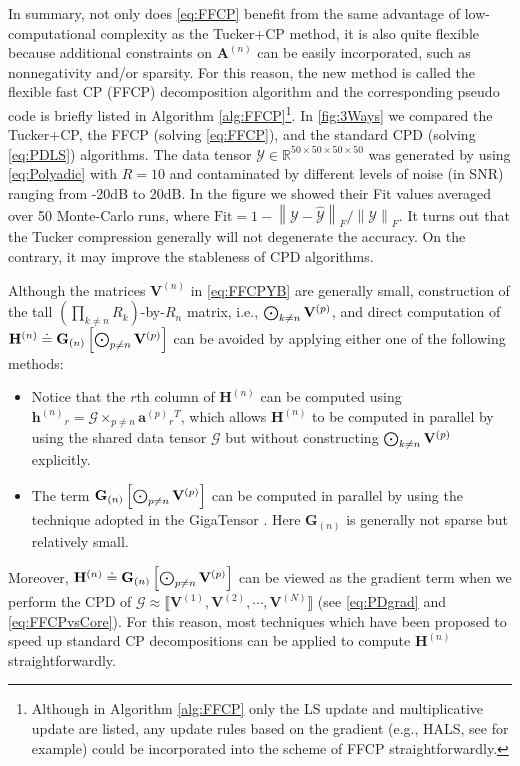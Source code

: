 \documentclass[10pt,twocolumn,twoside]{IEEEtran}
\newcommand{\tensor}[1]{\ensuremath{\boldsymbol{\mathscr{#1}}}}
\newcommand{\tenmat}[2][n]{\ensuremath{{\mathbf{#2}}_{(#1)}}}
\newcommand{\matn}[2][n]{\ensuremath{\mathbf{#2}^{(#1)}}}
\newcommand{\compactcp}[1]{\ensuremath{\llbracket {\mathbf{#1}}^{(1)}, {\mathbf{#1}}^{(2)}, \cdots, {\mathbf{#1}}^{(N)}\rrbracket}}
\newcommand{\Real}{\ensuremath{\mathbb{R}}}
\newcommand{\defeq}{\ensuremath{\doteq}}
\newcommand{\frob}[2][F]{\ensuremath{\left\|#2\right\|_{#1}}}
\begin{document}
In summary, not only does \eqref{eq:FFCP} benefit from the same advantage of low-computational complexity as the Tucker+CP method, it is also quite flexible because additional constraints on \matn{A} can be easily incorporated, such as nonnegativity and/or sparsity. For this reason, the new method is called the flexible fast CP (FFCP) decomposition algorithm and the corresponding pseudo code is briefly listed in Algorithm \ref{alg:FFCP}\footnote{ Although in Algorithm \ref{alg:FFCP} only the LS update and multiplicative update are listed, any update rules based on the gradient (e.g., HALS, see \cite{SPM_NMFNTD} for example) could be incorporated into the scheme of FFCP straightforwardly.}. In \figurename \ref{fig:3Ways} we compared the Tucker+CP, the FFCP (solving \eqref{eq:FFCP}), and the standard CPD (solving \eqref{eq:PDLS}) algorithms. The data tensor $\tensor{Y}\in\Real^{50\times50\times50\times50}$ was generated by using \eqref{eq:Polyadic} with $R=10$ and contaminated by different levels of noise (in SNR) ranging from -20dB to 20dB. In the figure we showed their Fit values averaged over 50 Monte-Carlo runs, where $\text{Fit}=1-{\frob{\tensor{Y}-\tensor{\hat{Y}}}}/{\frob{\tensor{Y}}}$. It turns out that the Tucker compression generally will not degenerate the accuracy. On the contrary, it may improve the stableness of CPD algorithms.







Although the matrices \matn{V} in \eqref{eq:FFCPYB} are generally small,  construction of the  tall $(\prod_{k\neq n}R_k)$-by-$R_n$ matrix, i.e., $\bigkrp_{k\neq n}\matn[p]{V}$, and  direct computation of $\matn{H}\defeq\tenmat{G}\left[\bigkrp\nolimits_{p\neq n}{\matn[p]{V}}\right]$ can be avoided by applying either one of the following methods:
\begin{itemize}
\item Notice that the $r$th column of \matn{H} can be computed using  $\matn{h}_r=\tensor{G}\times_{p\neq n}\matn[p]{a}_r{}^T$, which allows \matn{H} to be computed in parallel by using the shared data tensor \tensor{G} but without constructing  $\bigkrp_{k\neq n}\matn[p]{V}$ explicitly.

\item The term $\tenmat{G}\left[\bigkrp\nolimits_{p\neq n}{\matn[p]{V}}\right]$ can be computed in parallel by using the technique adopted in the GigaTensor \cite{GigaTensor}. Here \tenmat{G} is generally not sparse but relatively small.
\end{itemize}
Moreover, $\matn{H}\defeq\tenmat{G}\left[\bigkrp\nolimits_{p\neq n}{\matn[p]{V}}\right]$ can be viewed as the gradient term when we perform the CPD of $\tensor{G}\approx\compactcp{V}$ (see \eqref{eq:PDgrad} and \eqref{eq:FFCPvsCore}).  For this reason, most techniques which have been proposed to speed up standard CP decompositions  can be applied to compute \matn{H} straightforwardly. 
\end{document}

